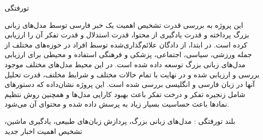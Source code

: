 


‌تورفتگی

این پروژه به بررسی قدرت تشخیص اهمیت یک خبر فارسی توسط مدل‌های زبانی بزرگ پرداخته و قدرت یادگیری از محتوا، قدرت استدلال و قدرت تفکر آن را ارزیابی کرده است. در ابتدا، از دادگان علائم‌گذاری‌شده توسط افراد در حوزه‌های مختلف از جمله ورزشی، سیاسی، اجتماعی، پزشکی و فرهنگی استفاده و محیطی برای ارزیابی مدل‌های زبانی بزرگ توسعه داده شده است. در این محیط مدل‌های مختلف موجود بررسی و ارزیابی شده و در نهایت با تمام حالات مختلف و شرایط مخلتف، قدرت تحلیل آنها در زبان فارسی و انگلیسی بررسی شده است. این پروژه نشان‌داده که دستور‌های شامل زنجیره تفکر و درخت تفکر باعث بهبود کارایی مدل‌ها و همچنین روش نتظیم نمادها باعث حساسیت بسیار زیاد به پرسش داده شده و محتوای آن می‌شود.

‌بلند
‌تورفتگی : 
مدل‌های زبانی بزرگ، پردازش زبان‌های طبیعی، یادگیری ماشین، تشخیص اهمیت اخبار
‌جدید

